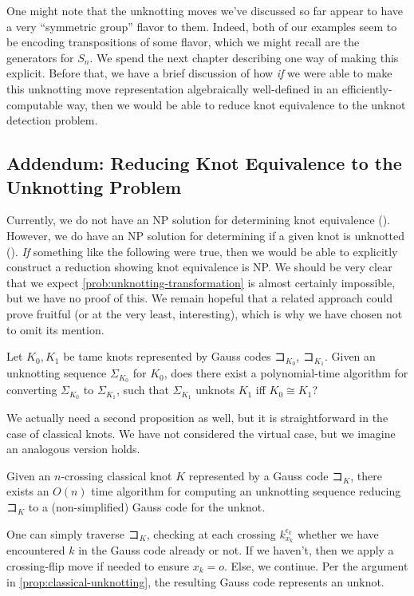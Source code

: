One might note that the unknotting moves we've discussed so far appear
to have a very ``symmetric group'' flavor to them. Indeed, both of our
examples seem to be encoding transpositions of some flavor, which we
might recall are the generators for $S_n$. We spend the next chapter
describing one way of making this explicit. Before that, we have a
brief discussion of how \emph{if} we were able to make this unknotting
move representation algebraically well-defined in an
efficiently-computable way, then we would be able to reduce knot
equivalence to the unknot detection problem.

\subsection{Addendum: Reducing Knot Equivalence to the Unknotting
  Problem}
Currently, we do not have an NP solution for determining knot
equivalence (\cite{Lackenby2016Apr}). However, we do have an NP
solution for determining if a given knot is unknotted
(\cite{Lackenby2013Feb}). \emph{If} something like the following were
true, then we would be able to explicitly construct a reduction
showing knot equivalence is NP. We should be very clear that we expect
\cref{prob:unknotting-transformation} is almost certainly impossible,
but we have no proof of this. We remain hopeful that a related
approach could prove fruitful (or at the very least, interesting),
which is why we have chosen not to omit its mention.
\begin{problem}\label{prob:unknotting-transformation}
  Let $K_0, K_1$ be tame knots represented by Gauss codes $コ_{K_0}$,
  $コ_{K_1}$. Given an unknotting sequence $\Sigma_{K_0}$ for $K_0$,
  does there exist a polynomial-time algorithm for converting
  $\Sigma_{K_0}$ to $\Sigma_{K_1}$, such that $\Sigma_{K_1}$ unknots
  $K_1$ iff $K_0 \cong K_1$?
\end{problem}
We actually need a second proposition as well, but it is
straightforward in the case of classical knots. We have not considered
the virtual case, but we imagine an analogous version holds.
\begin{proposition}
  Given an $n$-crossing classical knot $K$ represented by a Gauss code
  $コ_K$, there exists an $O(n)$ time algorithm for computing an
  unknotting sequence reducing $コ_K$ to a (non-simplified) Gauss code
  for the unknot.
\end{proposition}
\begin{sproof}
  One can simply traverse $コ_K$, checking at each crossing
  $k_{x_k}^{\epsilon_k}$ whether we have encountered $k$ in the Gauss
  code already or not. If we haven't, then we apply a crossing-flip
  move if needed to ensure $x_k = o$. Else, we continue. Per the
  argument in \cref{prop:classical-unknotting}, the resulting Gauss
  code represents an unknot.
\end{sproof}
